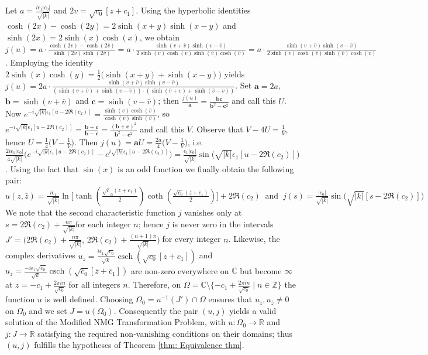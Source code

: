 \documentclass[12pt]{article}
\theoremstyle{plain}
\theoremstyle{definition}
\theoremstyle{remark}
\begin{document}
  Let \(a = \tfrac{i\epsilon_1 |c_0|}{\sqrt{|k|}}\) and \(2v = \sqrt{c_0}[z + c_1]\). Using the hyperbolic identities \(\cosh(2x) - \cosh(2y) = 2\sinh(x + y)\sinh(x - y)\) and \(\sinh(2x) = 2\sinh(x)\cosh(x)\), we obtain \(j(u) = a \cdot \frac{\cosh(2v) - \cosh(2\bar{v})}{\sinh(2v)\sinh(2\bar{v})} = a \cdot \frac{\sinh(v + \bar{v})\sinh(v - \bar{v})}{2\sinh(v)\cosh(v)\sinh(\bar{v})\cosh(\bar{v})}=a\cdot \frac{\sinh(v+\bar v)\sinh(v-\bar v)}{2\sinh(v)\cosh(\bar v)\sinh(\bar v)\cosh(v)}\).  Employing the identity \(2\sinh(x)\cosh(y) =\tfrac{1}{2}\big(\sinh(x+y)+\sinh(x-y)\big)\) yields \(j(u) = 2a\cdot\frac{\sinh(v+\bar v)\sinh(v-\bar v)}{(\sinh(v+\bar v)+\sinh(v-\bar v))\cdot (\sinh(\bar v+v)+\sinh(\bar v-v))}\).  Set \(\mathbf{a}=2a\), \(\mathbf{b}=\sinh(v+\bar v)\) and \(\mathbf{c}=\sinh(v-\bar v)\); then \(\tfrac{j(u)}{\mathbf{a}}=\frac{\mathbf{b}\mathbf{c}}{\mathbf{b}^2-\mathbf{c}^2}\) and call this \(U\). Now \(e^{-i\sqrt{|k|}\epsilon_1[u-2\Re(c_2)]}=\tfrac{\sinh(v)\cosh(\bar v)}{\cosh(v)\sinh(\bar v)}\), so \(e^{-i\sqrt{|k|}\epsilon_1[u-2\Re(c_2)]}=\tfrac{\mathbf{b}+\mathbf{c}}{\mathbf{b}-\mathbf{c}}=\tfrac{(\mathbf{b}+\mathbf{c})^2}{\mathbf{b}^2-\mathbf{c}^2}\) and call this \(V\). Observe that \(V-4U=\frac{1}{V}\), hence \(U=\tfrac{1}{4}\big(V-\tfrac{1}{V}\big)\). Then \(j(u)=\mathbf{a} U=\tfrac{2a}{4}\big(V-\tfrac{1}{V}\big)\), i.e. \(\tfrac{2i\epsilon_1|c_0|}{4\sqrt{|k|}}\big(e^{-i\sqrt{|k|}\epsilon_1[u-2\Re(c_2)]}-e^{i\sqrt{|k|}\epsilon_1[u-2\Re(c_2)]}\big)=\tfrac{\epsilon_1 |c_0|}{\sqrt{|k|}}\sin\big(\sqrt{|k|}\epsilon_1[u-2\Re(c_2)]\big)\). Using the fact that \(\sin(x)\) is an odd function  we finally obtain the following pair:
  \footnotesize\[
    \boxed{u(z,\bar z)=\tfrac{i\epsilon_1}{\sqrt{|k|}}\ln\big[\tanh(\tfrac{\sqrt c_0(z+c_1)}{2})\coth(\tfrac{\sqrt{\bar c_0}(\bar z+\bar c_1)}{2})\big]+2\Re(c_2)}\;\;\text{and}\;\; \boxed{j(s)=\tfrac{|c_0|}{\sqrt{|k|}}\sin\big(\sqrt{|k|}[s-2\Re(c_2)]\big)}
  \]\normalsize
  We note that the second characteristic function \(j\) vanishes only at \footnotesize\(s=2\Re(c_2)+\tfrac{n\pi}{\sqrt{|k|}}\)\normalsize for each integer \(n\); hence \(j\) is never zero in the intervals \footnotesize\(J'=\big(2\Re(c_2)+\tfrac{n\pi}{\sqrt{|k|}},\,2\Re(c_2)+\tfrac{(n+1)\pi}{\sqrt{|k|}}\big)\;\)\normalsize for every integer \(n\). Likewise, the complex derivatives \(u_z=\tfrac{i\epsilon_1 \sqrt{c_0}}{\sqrt{k}}\operatorname{csch}(\sqrt{c_0}[z+c_1])\) and \(u_{\bar{z}}=\tfrac{-i\epsilon_1 \sqrt{\bar{c}_0}}{\sqrt{k}}\operatorname{csch}(\sqrt{\bar{c}_0}[\bar{z}+\bar{c}_1])\) are non‑zero everywhere on \(\mathbb{C}\) but become \(\infty\) at \(z=-c_1+\tfrac{2\pi i n}{\sqrt{c_0}}\) for all integers \(n\). Therefore, on \(\Omega=\mathbb{C}\setminus\{-c_1+\tfrac{2\pi i n}{\sqrt{c_0}}\mid n\in\mathbb{Z}\}\) the function \(u\) is well defined. Choosing \(\Omega_0=u^{-1}(J')\cap\Omega\) ensures that \(u_z,u_{\bar{z}}\neq0\) on \(\Omega_0\) and we set \(J=u(\Omega_0)\). Consequently the pair \((u,j)\) yields a valid solution of the Modified NMG Transformation Problem, with \(u:\Omega_0\to\mathbb{R}\) and \(j:J\to\mathbb{R}\) satisfying the required non‑vanishing conditions on their domains; thus \((u,j)\) fulfills the hypotheses of Theorem \ref{thm: Equivalence thm}.
  
\end{document}
